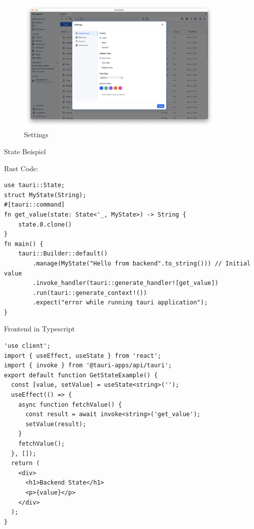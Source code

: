 \begin{figure}[H]
    \centering
    \includegraphics[width=0.9\textwidth]{before-after-images/Settings.png}
    \caption{Settings}
\end{figure}

\newpage

\LARGE
State Beispiel
\label{subsec:state-example}
\large

Rust Code:
{\small
\begin{verbatim}
use tauri::State;
struct MyState(String);
#[tauri::command]
fn get_value(state: State<'_, MyState>) -> String {
    state.0.clone()
}
fn main() {
    tauri::Builder::default()
        .manage(MyState("Hello from backend".to_string())) // Initial value
        .invoke_handler(tauri::generate_handler![get_value])
        .run(tauri::generate_context!())
        .expect("error while running tauri application");
}
\end{verbatim}
}


Frontend in Typescript
{\small

\begin{verbatim}
'use client';
import { useEffect, useState } from 'react';
import { invoke } from '@tauri-apps/api/tauri';
export default function GetStateExample() {
  const [value, setValue] = useState<string>('');
  useEffect(() => {
    async function fetchValue() {
      const result = await invoke<string>('get_value');
      setValue(result);
    }
    fetchValue();
  }, []);
  return (
    <div>
      <h1>Backend State</h1>
      <p>{value}</p>
    </div>
  );
}
\end{verbatim}
}


